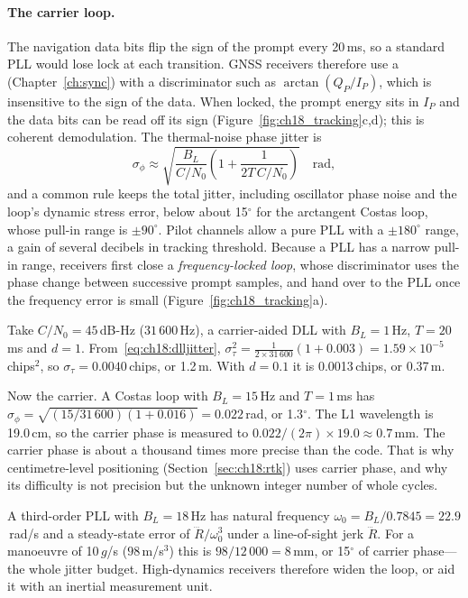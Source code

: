 \paragraph{The carrier loop.} The navigation data bits flip the sign of the prompt every
20\,ms, so a standard PLL would lose lock at each transition. GNSS receivers therefore use a
 (Chapter~\ref{ch:sync}) with a discriminator such as $\arctan(Q_P/I_P)$,
which is insensitive to the sign of the data. When locked, the prompt energy sits in $I_P$
and the data bits can be read off its sign (Figure~\ref{fig:ch18_tracking}c,d); this is
coherent demodulation. The thermal-noise phase jitter is
\begin{equation}
\sigma_\phi\approx\sqrt{\frac{B_L}{C/N_0}\left(1+\frac{1}{2T\,C/N_0}\right)}\quad\text{rad},
\end{equation}
and a common rule keeps the total jitter, including oscillator phase noise and the loop's
dynamic stress error, below about 15$^\circ$ for the arctangent Costas loop, whose pull-in
range is $\pm90^\circ$. Pilot channels allow a pure PLL with a $\pm180^\circ$ range, a gain of
several decibels in tracking threshold. Because a PLL has a narrow pull-in range,
receivers first close a \emph{frequency-locked loop}, whose discriminator uses the phase
change between successive prompt samples, and hand over to the PLL once the frequency error
is small (Figure~\ref{fig:ch18_tracking}a).


\begin{worked}
Take $C/N_0=45$\,dB-Hz ($31\,600$\,Hz), a carrier-aided DLL with $B_L=1$\,Hz, $T=20$\,ms and
$d=1$. From~\eqref{eq:ch18:dlljitter}, $\sigma_\tau^2=\frac{1}{2\times31\,600}(1+0.003)=1.59\times
10^{-5}$\,chips$^2$, so $\sigma_\tau=0.0040$\,chips, or 1.2\,m. With $d=0.1$ it is
0.0013\,chips, or 0.37\,m.

Now the carrier. A Costas loop with $B_L=15$\,Hz and $T=1$\,ms has
$\sigma_\phi=\sqrt{(15/31\,600)(1+0.016)}=0.022$\,rad, or 1.3$^\circ$. The L1 wavelength is
19.0\,cm, so the carrier phase is measured to $0.022/(2\pi)\times19.0\approx0.7$\,mm. The
carrier phase is about a thousand times more precise than the code. That is why
centimetre-level positioning (Section~\ref{sec:ch18:rtk}) uses carrier phase, and why its
difficulty is not precision but the unknown integer number of whole cycles.

A third-order PLL with $B_L=18$\,Hz has natural frequency $\omega_0=B_L/0.7845=22.9$\,rad/s
and a steady-state error of $\dddot R/\omega_0^3$ under a line-of-sight jerk $\dddot R$. For
a manoeuvre of 10\,$g$/s ($98$\,m/s$^3$) this is $98/12\,000=8$\,mm, or 15$^\circ$ of carrier
phase---the whole jitter budget. High-dynamics receivers therefore widen the loop, or aid it
with an inertial measurement unit.
\end{worked}

